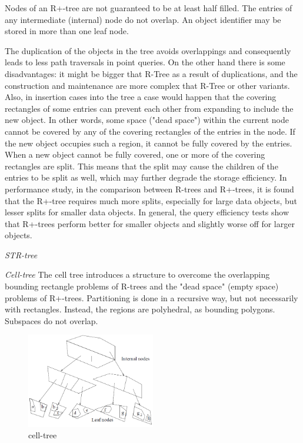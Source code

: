 \documentclass[a4paper,12pt]{article}
\begin{document}
Nodes of an R+-tree are not guaranteed to be at least half filled.
 The entries of any intermediate (internal) node do not overlap.
 An object identifier may be stored in more than one leaf node.

The duplication of the objects in the tree avoids overlappings and consequently leads to less path traversals in point queries. 
On the other hand there is some disadvantages: it might be bigger that R-Tree as a result of duplications, and the construction and maintenance are more complex that R-Tree or other variants. 
Also, in insertion cases into the tree a case would happen that the covering rectangles of some entries can prevent each other from expanding to include the new object. In other words, some space ("dead space") within the current node cannot be covered by any of the covering rectangles of the entries in the node. If the new object occupies such a region, it cannot be fully covered by the entries. When a new object cannot be fully covered, one or more of the covering rectangles are split. This means that the split may cause the children of the entries to be split as well, which may further degrade the storage efficiency.
In performance study, in the comparison between R-trees and R+-trees, it is found that the R+-tree requires much more splits, especially for large data objects, but lesser splits for smaller data objects. 
In general, the query efficiency tests show that R+-trees perform better for smaller objects and slightly worse off for larger objects.

\emph{STR-tree}

\emph{Cell-tree}
The cell tree introduces a structure to overcome the overlapping bounding rectangle problems of R-trees and the "dead space" (empty space) problems of R+-trees. Partitioning is done in a recursive way, but not necessarily with rectangles. Instead, the regions are polyhedral, as bounding polygons. Subspaces do not overlap.  
\begin{figure}
\centering
\includegraphics[width=0.5\textwidth]{celltree}
\caption{cell-tree}
\label{figcelltree}
\end{figure}
\end{document}
